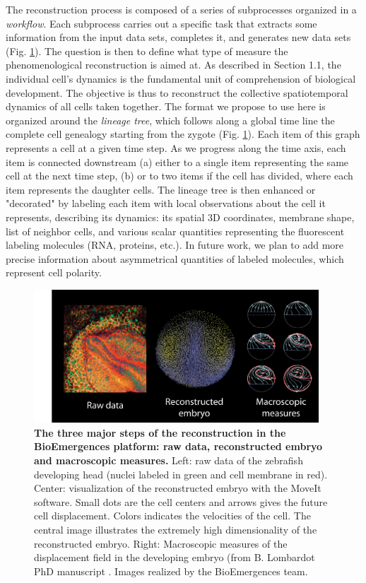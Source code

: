 The reconstruction process is composed of a series of subprocesses organized in a \textit{workflow}. Each subprocess carries out a specific task that extracts some information from the input data sets, completes it, and generates new data sets (Fig. \ref{schema_raw_reconstructed_embryo_macroscopic}). The question is then to define what type of measure the phenomenological reconstruction is aimed at. As described in Section 1.1, the individual cell's dynamics is the fundamental unit of comprehension of biological development. The objective is thus to reconstruct the collective spatiotemporal dynamics of all cells taken together. The format we propose to use here is organized around the \textit{lineage tree}, which follows along a global time line the complete cell genealogy starting from the zygote (Fig. \ref{schema_raw_reconstructed_embryo_macroscopic}). Each item of this graph represents a cell at a given time step. As we progress along the time axis, each item is connected downstream (a) either to a single item representing the same cell at the next time step, (b) or to two items if the cell has divided, where each item represents the daughter cells. The lineage tree is then enhanced or "decorated" by labeling each item with local observations about the cell it represents, describing its dynamics: its spatial 3D coordinates, membrane shape, list of neighbor cells, and various scalar quantities representing the fluorescent labeling molecules (RNA, proteins, etc.). In future work, we plan to add more precise information about asymmetrical quantities of labeled molecules, which represent cell polarity.
\begin{figure}
\begin{center}
\includegraphics[width=0.95\textwidth]{../../images/experimental_science/schema_raw_reconstructed_embryo_macroscopic.png}
\end{center}
\caption{\textbf{The three major steps of the reconstruction in the BioEmergences platform: raw data, reconstructed embryo and macroscopic measures. } Left: raw data of the zebrafish developing head (nuclei labeled in green and cell membrane in red). Center: visualization of the reconstructed embryo with the MoveIt software. Small dots are the cell centers and arrows gives the future cell displacement. Colors indicates the velocities of the cell. The central image illustrates the extremely high dimensionality of the reconstructed embryo. Right: Macroscopic measures of the displacement field in the developing embryo (from B. Lombardot PhD manuscript \cite{Lombardot:2010vd}. Images realized by the BioEmergences team.}
\label{schema_raw_reconstructed_embryo_macroscopic}
\end{figure}

